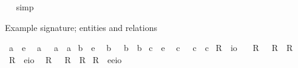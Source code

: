 \begin{isabellebody}
\isadelimproof
\ %
\endisadelimproof
%
\isatagproof
{}\isamarkupfalse%
\ {\isacharparenleft}simp{\isacharparenright}\ \isamarkupfalse%
%
\endisatagproof
{\isafoldproof}%
%
\isadelimproof
%
\endisadelimproof
%
\begin{isamarkuptext}%
Example signature; entities and relations%
\end{isamarkuptext}%
\isamarkuptrue%
\isamarkupfalse%
\ a{\isacharunderscore}{}\ {\isacharcolon}{\isacharcolon}\ {\isachardoublequoteopen}e{\isachardoublequoteclose}\ \isamarkupfalse%
\ a\ \ \ {\isachardoublequoteopen}a\ {\isasymequiv}\ {\isachardot}a{\isacharunderscore}{}{\isachardot}{\isachardoublequoteclose}\isanewline
{}\isamarkupfalse%
\ b{\isacharunderscore}{}\ {\isacharcolon}{\isacharcolon}\ {\isachardoublequoteopen}e{\isachardoublequoteclose}\ \isamarkupfalse%
\ b\ \ \ {\isachardoublequoteopen}b\ {\isasymequiv}\ {\isachardot}b{\isacharunderscore}{}{\isachardot}{\isachardoublequoteclose}\isanewline
{}\isamarkupfalse%
\ c{\isacharunderscore}{}\ {\isacharcolon}{\isacharcolon}\ {\isachardoublequoteopen}e{\isachardoublequoteclose}\ \isamarkupfalse%
\ c\ \ \ {\isachardoublequoteopen}c\ {\isasymequiv}\ {\isachardot}c{\isacharunderscore}{}{\isachardot}{\isachardoublequoteclose}\isanewline
\isanewline
{}\isamarkupfalse%
\ R{\isacharunderscore}{}\ {\isacharcolon}{\isacharcolon}\ {\isachardoublequoteopen}io{\isachardoublequoteclose}\ \ \isamarkupfalse%
\ R{}\ \ \ {\isachardoublequoteopen}R{}\ {\isasymequiv}\ {\isachardot}R{\isacharunderscore}{}{\isachardot}{\isachardoublequoteclose}\isanewline
{}\isamarkupfalse%
\ R{\isacharunderscore}{}\ {\isacharcolon}{\isacharcolon}\ {\isachardoublequoteopen}e{\isasymRightarrow}io{\isachardoublequoteclose}\ \isamarkupfalse%
\ R{}\ \ \ {\isachardoublequoteopen}R{}\ {\isasymequiv}\ {\isachardot}R{\isacharunderscore}{}{\isachardot}{\isachardoublequoteclose}\isanewline
{}\isamarkupfalse%
\ R{\isacharunderscore}{}\ {\isacharcolon}{\isacharcolon}\ {\isachardoublequoteopen}e{\isasymRightarrow}e{\isasymRightarrow}io{\isachardoublequoteclose}\ \isamarkupfalse%

\end{isabellebody}

